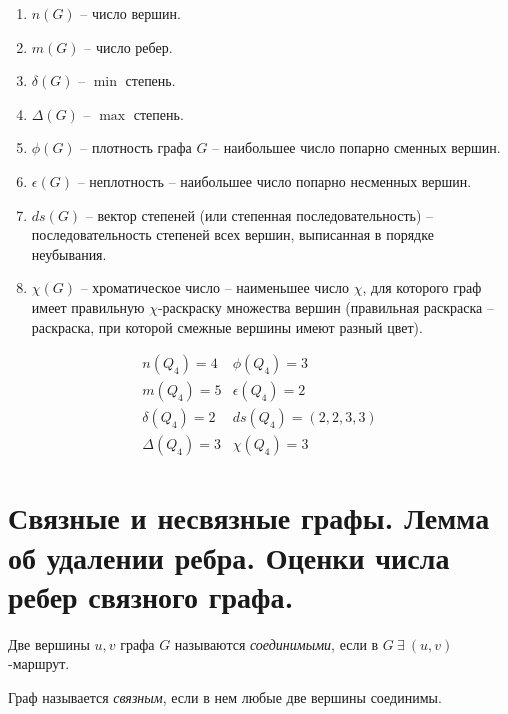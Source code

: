 \begin{example}\leavevmode
    \begin{enumerate}
        \item $ n(G) $ -- число вершин.
        \item $ m(G) $ -- число ребер.
        \item $ \delta(G) $ -- $ \min $ степень.
        \item $ \Delta(G) $ -- $ \max $ степень.
        \item $ \phi(G) $ -- плотность графа $ G $ -- наибольшее число попарно сменных вершин.
        \item $ \epsilon(G) $ -- неплотность -- наибольшее число попарно несменных вершин.
        \item $ ds(G) $ -- вектор степеней (или степенная последовательность) -- последовательность степеней всех вершин, выписанная в порядке неубывания.
        \item $ \chi(G) $ -- хроматическое число -- наименьшее число $ \chi $, для которого граф имеет правильную $ \chi $-раскраску множества вершин (правильная раскраска -- раскраска, при которой смежные вершины имеют разный цвет).
    \end{enumerate}
    \begin{figure}[H]
        \centering
        \label{fig:fig_17}
    \end{figure}
    \[
        \begin{array}{ll}
            n(Q_4) = 4      & \phi(Q_4) = 3       \\
            m(Q_4) = 5      & \epsilon(Q_4) = 2   \\
            \delta(Q_4) = 2 & ds(Q_4) = (2,2,3,3) \\
            \Delta(Q_4) = 3 & \chi(Q_4) = 3
        \end{array}
    \]
\end{example}

\section{Связные и несвязные графы. Лемма об удалении ребра. Оценки числа ребер связного графа.}

\begin{definition}
    Две вершины $ u,v $ графа $ G $ называются \emph{соединимыми}, если в $ G \ \exists \ (u,v) $-маршрут.

    Граф называется \emph{связным}, если в нем любые две вершины соединимы.
\end{definition}

